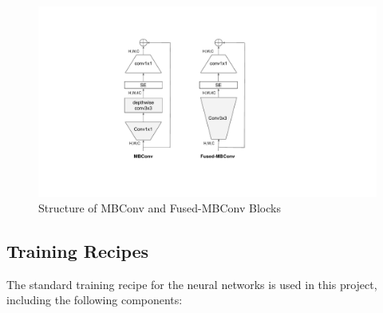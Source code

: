 \documentclass[10pt,letterpaper]{article}
\begin{document}
\begin{figure}[ht]
    \centering
    \includegraphics{figs/fusedmbconv.pdf}
    \caption{Structure of MBConv and Fused-MBConv Blocks \cite{tan2021efficientnetv2}}
    \label{fig:fusedmbconv}
\end{figure}

\subsection{Training Recipes}
The standard training recipe for the neural networks is used in this project, including the following components:
\end{document}
